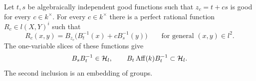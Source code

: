 \begin{lemma}\label{lem:field-affine}
Let \(t,s\) be algebraically independent good functions such that
\(z_c=t+cs\) is good for every \(c\in k^\times\).
For every \(c\in k^\times\) there is a perfect rational function
\(R_c\in l(X,Y)^i\) such that
\begin{equation}\label{eq:field-sum}
 R_c(x,y)=B_{z_c}\bigl(B_t^{-1}(x)+cB_s^{-1}(y)\bigr)
 \qquad\text{for general }(x,y)\in l^2.
\end{equation}
The one-variable slices of these functions give
\begin{equation}\label{eq:field-affine}
 B_sB_t^{-1}\in\mathcal H_l,
 \qquad
 B_t\operatorname{Aff}(k)B_t^{-1}\subset\mathcal H_l.
\end{equation}
The second inclusion is an embedding of groups.
\end{lemma}

